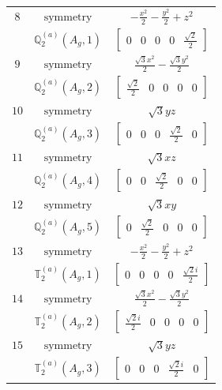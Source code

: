 \documentclass[fleqn,8pt,landscape]{jsarticle}
\begin{document}
\begin{longtable}{ccc}
$ 8 $ & $ \text{symmetry} $ & $ - \frac{x^{2}}{2} - \frac{y^{2}}{2} + z^{2} $ \\
$  $ & $ \mathbb{Q}_{2}^{(a)}(A_{g},1) $ & $ \begin{bmatrix} 0 & 0 & 0 & 0 & \frac{\sqrt{2}}{2} \end{bmatrix} $ \\ \hline
$ 9 $ & $ \text{symmetry} $ & $ \frac{\sqrt{3} x^{2}}{2} - \frac{\sqrt{3} y^{2}}{2} $ \\
$  $ & $ \mathbb{Q}_{2}^{(a)}(A_{g},2) $ & $ \begin{bmatrix} \frac{\sqrt{2}}{2} & 0 & 0 & 0 & 0 \end{bmatrix} $ \\ \hline
$ 10 $ & $ \text{symmetry} $ & $ \sqrt{3} y z $ \\
$  $ & $ \mathbb{Q}_{2}^{(a)}(A_{g},3) $ & $ \begin{bmatrix} 0 & 0 & 0 & \frac{\sqrt{2}}{2} & 0 \end{bmatrix} $ \\ \hline
$ 11 $ & $ \text{symmetry} $ & $ \sqrt{3} x z $ \\
$  $ & $ \mathbb{Q}_{2}^{(a)}(A_{g},4) $ & $ \begin{bmatrix} 0 & 0 & \frac{\sqrt{2}}{2} & 0 & 0 \end{bmatrix} $ \\ \hline
$ 12 $ & $ \text{symmetry} $ & $ \sqrt{3} x y $ \\
$  $ & $ \mathbb{Q}_{2}^{(a)}(A_{g},5) $ & $ \begin{bmatrix} 0 & \frac{\sqrt{2}}{2} & 0 & 0 & 0 \end{bmatrix} $ \\ \hline
$ 13 $ & $ \text{symmetry} $ & $ - \frac{x^{2}}{2} - \frac{y^{2}}{2} + z^{2} $ \\
$  $ & $ \mathbb{T}_{2}^{(a)}(A_{g},1) $ & $ \begin{bmatrix} 0 & 0 & 0 & 0 & \frac{\sqrt{2} i}{2} \end{bmatrix} $ \\ \hline
$ 14 $ & $ \text{symmetry} $ & $ \frac{\sqrt{3} x^{2}}{2} - \frac{\sqrt{3} y^{2}}{2} $ \\
$  $ & $ \mathbb{T}_{2}^{(a)}(A_{g},2) $ & $ \begin{bmatrix} \frac{\sqrt{2} i}{2} & 0 & 0 & 0 & 0 \end{bmatrix} $ \\ \hline
$ 15 $ & $ \text{symmetry} $ & $ \sqrt{3} y z $ \\
$  $ & $ \mathbb{T}_{2}^{(a)}(A_{g},3) $ & $ \begin{bmatrix} 0 & 0 & 0 & \frac{\sqrt{2} i}{2} & 0 \end{bmatrix} $ \\ \hline

\end{longtable}
\end{document}
